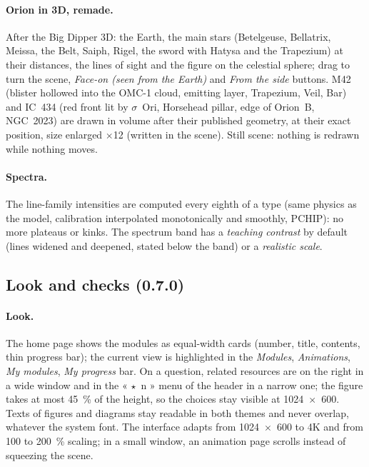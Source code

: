 \paragraph{Orion in 3D, remade.} After the Big Dipper 3D: the Earth, the main stars (Betelgeuse, Bellatrix, Meissa,
the Belt, Saiph, Rigel, the sword with Hatysa and the Trapezium) at their distances, the lines of sight and the figure on
the celestial sphere; drag to turn the scene, \emph{Face-on (seen from the Earth)} and \emph{From the side} buttons.
M42 (blister hollowed into the OMC-1 cloud, emitting layer, Trapezium, Veil, Bar) and IC~434 (red front lit by
$\sigma$~Ori, Horsehead pillar, edge of Orion~B, NGC~2023) are drawn in volume after their published geometry, at their
exact position, size enlarged $\times$12 (written in the scene). Still scene: nothing is redrawn while nothing moves.

\paragraph{Spectra.} The line-family intensities are computed every eighth of a type (same physics as the model,
calibration interpolated monotonically and smoothly, PCHIP): no more plateaus or kinks. The spectrum band has a
\emph{teaching contrast} by default (lines widened and deepened, stated below the band) or a \emph{realistic scale}.

\subsection{Look and checks (0.7.0)}\label{sec:finale}
\paragraph{Look.} The home page shows the modules as equal-width cards (number, title, contents, thin progress bar);
the current view is highlighted in the \emph{Modules}, \emph{Animations}, \emph{My modules}, \emph{My progress} bar.
On a question, related resources are on the right in a wide window and in the « $\star$~n » menu of the header in a
narrow one; the figure takes at most 45~\% of the height, so the choices stay visible at 1024~$\times$~600. Texts of
figures and diagrams stay readable in both themes and never overlap, whatever the system font. The interface adapts
from 1024~$\times$~600 to 4K and from 100 to 200~\% scaling; in a small window, an animation page scrolls instead of
squeezing the scene.

